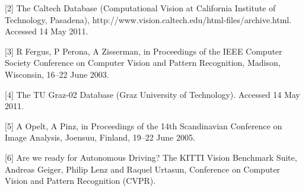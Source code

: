 \documentclass[10pt,journal,compsoc]{IEEEtran}
\begin{document}


[2] The Caltech Database (Computational Vision at California Institute of Technology, Pasadena), http://www.vision.caltech.edu/html-files/archive.html. Accessed 14 May 2011.

[3] R Fergus, P Perona, A Zisserman, in Proceedings of the IEEE Computer Society Conference on Computer Vision and Pattern Recognition, Madison, Wisconsin, 16–22 June 2003.

[4] The TU Graz-02 Database (Graz University of Technology). Accessed 14 May 2011. 

[5] A Opelt, A Pinz, in Proceedings of the 14th Scandinavian Conference on Image Analysis, Joensuu, Finland, 19–22 June 2005.

[6] Are we ready for Autonomous Driving? The KITTI Vision Benchmark Suite, Andreas Geiger, Philip Lenz and Raquel Urtasun, Conference on Computer Vision and Pattern	Recognition (CVPR).
\end{document}
